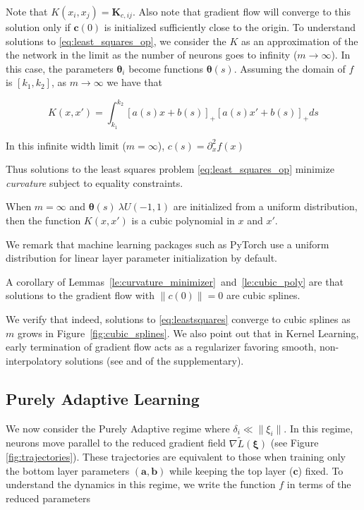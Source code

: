 Note that $K(x_i, x_j) = \bm K_{c, ij}$. Also note that gradient flow will converge to this solution only if $\bm c(0)$ is initialized sufficiently close to the origin. To understand solutions to \eqref{eq:least_squares_op}, we consider the $K$ as an approximation of the the network in the limit as the number of neurons goes to infinity ($m \rightarrow \infty$). In this case, the parameters $\bm \theta_i$ become functions $\bm \theta(s)$. Assuming the domain of $f$ is $[k_1, k_2]$, as $m \rightarrow \infty$ we have that

\begin{equation}
    K(x, x') = \int_{k_1}^{k_2} [a(s)x + b(s)]_+ [a(s)x' + b(s)]_+ ds
\end{equation}

\begin{lemma}\label{le:curvature_minimizer}
In this infinite width limit ($m = \infty$), $c(s) = \partial_x^2 f(x)$
\end{lemma}

Thus solutions to the least squares problem \eqref{eq:least_squares_op} minimize \emph{curvature} subject to equality constraints. 
\begin{lemma}\label{le:cubic_poly}
When $m = \infty$ and $\bm \theta(s) ~ \lambda U(-1, 1)$ are initialized from a uniform distribution, then the function $K(x, x')$ is a cubic polynomial in $x$ and $x'$.
\end{lemma}

We remark that machine learning packages such as PyTorch use a uniform distribution for linear layer parameter initialization by default.

\begin{corollary}
A corollary of Lemmas~\ref{le:curvature_minimizer}~and~\ref{le:cubic_poly} are that solutions to the gradient flow with $\|c(0)\| = 0$ are cubic splines. 
\end{corollary}

We verify that indeed, solutions to \eqref{eq:leastsquares} converge to cubic splines as $m$ grows in Figure~\ref{fig:cubic_splines}. We also point out that in Kernel Learning, early termination of gradient flow acts as a regularizer favoring smooth, non-interpolatory solutions (see \cite{NTKJacot} and  of the supplementary).



\subsection{Purely Adaptive Learning}
We now consider the Purely Adaptive regime where $\delta_i \ll \| \xi_i \|$. In this regime, neurons move parallel to the reduced gradient field $\nabla \tilde{L}(\bm \xi)$ (see Figure \ref{fig:trajectories}). These trajectories are equivalent to those when training only the bottom layer parameters $(\bm a, \bm b)$ while keeping the top layer ($\bm c$) fixed. To understand the dynamics in this regime, we write the function $f$ in terms of the reduced parameters

